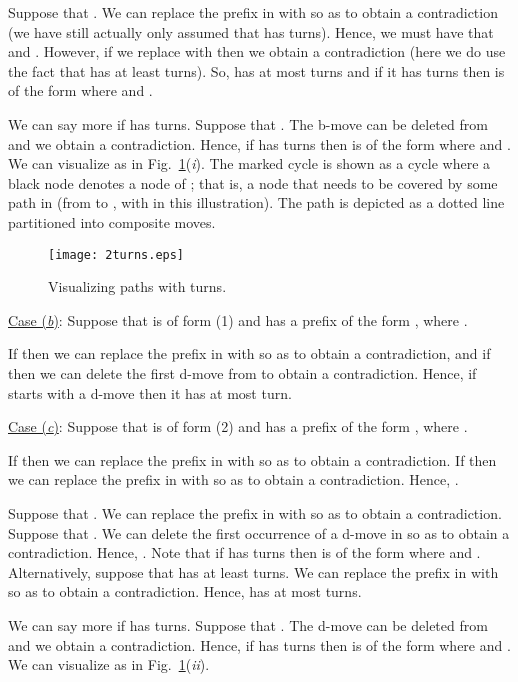\documentclass{article}
\newcounter{fig}
\begin{document}
Suppose that . We can replace the prefix  in  with  so as to obtain a contradiction (we have still actually only assumed that  has  turns). Hence, we must have that  and . However, if we replace  with  then we obtain a contradiction (here we do use the fact that  has at least  turns). So,  has at most  turns and if it has  turns then  is of the form  where  and .

We can say more if  has  turns. Suppose that . The b-move can be deleted from  and we obtain a contradiction. Hence, if  has  turns then  is of the form  where  and . We can visualize  as in Fig.~\ref{2turns}(\emph{i\/}). The marked cycle  is shown as a cycle where a black node denotes a node of ; that is, a node that needs to be covered by some path in  (from  to , with  in this illustration). The path  is depicted as a dotted line partitioned into composite moves.\smallskip

\begin{figure}[t]
\centering
\texttt{[image: 2turns.eps]}
\caption{Visualizing paths with  turns.}\label{2turns}
\end{figure}

\noindent\underline{Case (\emph{b\/})}: Suppose that  is of form (1) and has a prefix  of the form , where .\smallskip

\noindent If  then we can replace the prefix  in  with  so as to obtain a contradiction, and if  then we can delete the first d-move from  to obtain a contradiction. Hence, if  starts with a d-move then it has at most  turn.\smallskip

\noindent\underline{Case (\emph{c\/})}: Suppose that  is of form (2) and has a prefix  of the form , where .\smallskip

\noindent If  then we can replace the prefix  in  with  so as to obtain a contradiction. If  then we can replace the prefix  in  with  so as to obtain a contradiction. Hence, . 

Suppose that . We can replace the prefix  in  with  so as to obtain a contradiction. Suppose that . We can delete the first occurrence of a d-move in  so as to obtain a contradiction. Hence, . Note that if  has  turns then  is of the form  where  and . Alternatively, suppose that  has at least  turns. We can replace the prefix  in  with  so as to obtain a contradiction. Hence,  has at most  turns.

We can say more if  has  turns. Suppose that . The d-move can be deleted from  and we obtain a contradiction. Hence, if  has  turns then  is of the form  where  and . We can visualize  as in Fig.~\ref{2turns}(\emph{ii\/}).\smallskip
\end{document}

